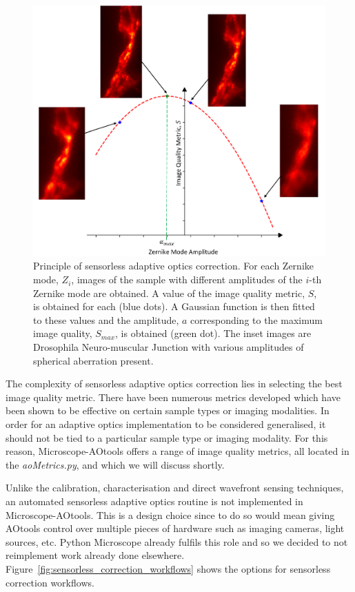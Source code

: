 \begin{figure}[h]
	\centering
	\includegraphics[width=1\textwidth,scale=0.5]{./images/sensorless_aberration_fitting_w_images.png}
	\caption{Principle of sensorless adaptive optics correction. For each Zernike mode, $Z_i$, images of the sample with different amplitudes of the $i$-th Zernike mode are obtained. A value of the image quality metric, $S$, is obtained for each (blue dots). A Gaussian function is then fitted to these values and the amplitude, $a$ corresponding to the maximum image quality, $S_{max}$, is obtained (green dot). The inset images are Drosophila Neuro-muscular Junction with various amplitudes of spherical aberration present.}
	\label{fig:sensorless_correction_method}
\end{figure}

The complexity of sensorless adaptive optics correction lies in selecting the best image quality metric. There have been numerous metrics developed which have been shown to be effective on certain sample types or imaging modalities.\cite{burke2015adaptive,booth2002adaptive,fienup2003aberration,debarre2008adaptive} In order for an adaptive optics implementation to be considered generalised, it should not be tied to a particular sample type or imaging modality. For this reason, Microscope-AOtools offers a range of image quality metrics, all located in the \textit{aoMetrics.py}, and which we will discuss shortly.  

Unlike the calibration, characterisation and direct wavefront sensing techniques, an automated sensorless adaptive optics routine is not implemented in Microscope-AOtools. This is a design choice since to do so would mean giving AOtools control over multiple pieces of hardware such as imaging cameras, light sources, etc. Python Microscope already fulfils this role and so we decided to not reimplement work already done elsewhere. Figure~\ref{fig:sensorless_correction_workflows} shows the options for sensorless correction workflows.


